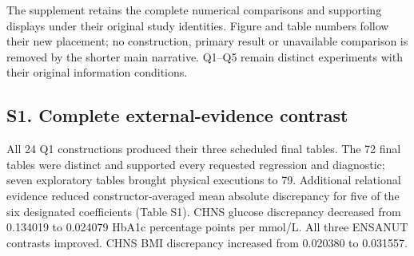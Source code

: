\documentclass[sigconf,anonymous,review]{acmart}
\begin{document}
The supplement retains the complete numerical comparisons and supporting displays under their original study identities. Figure and table numbers follow their new placement; no construction, primary result or unavailable comparison is removed by the shorter main narrative. Q1–\allowbreak{}Q5 remain distinct experiments with their original information conditions.


\subsection*{S1. Complete external-evidence contrast}

All 24 Q1 constructions produced their three scheduled final tables. The 72 final tables were distinct and supported every requested regression and diagnostic; seven exploratory tables brought physical executions to 79. Additional relational evidence reduced constructor-averaged mean absolute discrepancy for five of the six designated coefficients (Table S1). CHNS glucose discrepancy decreased from 0.134019 to 0.024079 HbA1c percentage points per mmol/\allowbreak{}L. All three ENSANUT contrasts improved. CHNS BMI discrepancy increased from 0.020380 to 0.031557.
\end{document}

